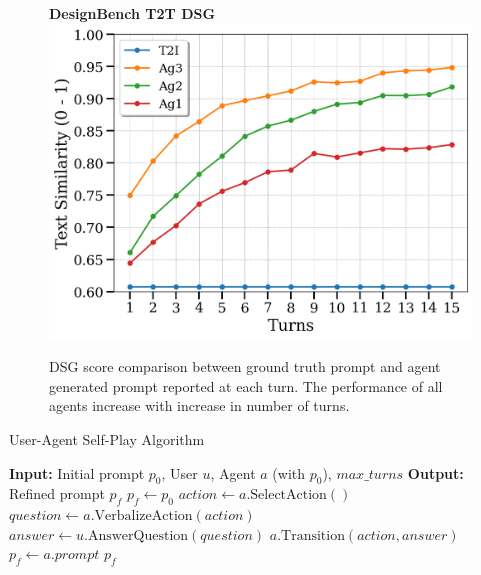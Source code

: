 \begin{figure}[h]
\begin{minipage}{0.49\textwidth}
  \end{minipage}
  \begin{minipage}{0.49\textwidth}
    \centering
    \textbf{DesignBench T2T DSG} 
    \includegraphics[width=\linewidth]{figures/toy_dataset_dsgt2t.png}
  \end{minipage}
  \caption{DSG score comparison between ground truth prompt and agent generated prompt reported at each turn. The performance of all agents increase with increase in number of turns.}
  \label{fig:dsg_figures}
\end{figure}


\begin{algorithm}[t]
\caption{User-Agent Self-Play Algorithm }
\label{alg:converse_algo}
\begin{algorithmic}[1] 
\STATE \textbf{Input:} Initial prompt $p_0$, User $u$, Agent $a$ (with $p_0$), $max\_turns$
\STATE \textbf{Output:} Refined prompt $p_f$ 
\STATE $p_f \gets p_0$ 
    \STATE $action \gets a.\text{SelectAction}()$
    \STATE $question \gets a.\text{VerbalizeAction}(action)$
    \STATE $answer \gets u.\text{AnswerQuestion}(question)$
    \STATE $a.\text{Transition}(action, answer)$
    \STATE $p_f \gets a.prompt$
\ENDFOR
\RETURN $p_f$
\end{algorithmic}
\end{algorithm}
